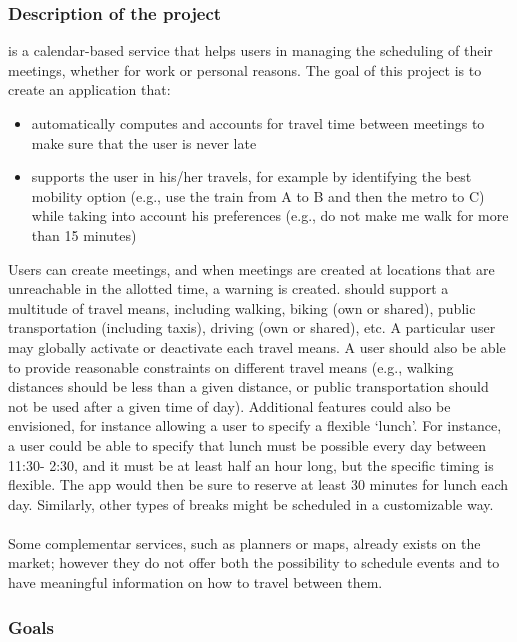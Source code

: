 \subsubsection{Description of the project}

\projectname is a calendar-based service that helps users in managing the scheduling of their meetings, whether for work or personal reasons.
The goal of this project is to create an application that: 
\begin{itemize}
\item automatically computes and accounts for travel time between meetings to make sure that the user is never late
\item supports the user in his/her travels, for example by identifying the best mobility option (e.g., use the train from A to B and then the metro to C) while taking into account his preferences (e.g., do not make me walk for more than 15 minutes)
\end{itemize}
Users can create meetings, and when meetings are created at locations that are unreachable in the allotted time, a warning is created. \projectname should support a multitude of travel means, including walking, biking (own or shared), public transportation (including taxis), driving (own or shared), etc. A particular user may globally activate or deactivate each travel means. A user should also be able to provide reasonable constraints on different travel means (e.g., walking distances should be less than a given distance, or public transportation should not be used after a given time of day). Additional features could also be envisioned, for instance allowing a user to specify a flexible `lunch'. For instance, a user could be able to specify that lunch must be possible every day between 11:30- 2:30, and it must be at least half an hour long, but the specific timing is flexible. The app would then be sure to reserve at least 30 minutes for lunch each day. Similarly, other types of breaks might be scheduled in a customizable way.
\\
\\
Some complementar services, such as planners or maps, already exists on the market; however they do not offer both the possibility to schedule events and to have meaningful information on how to travel between them.

\subsubsection{Goals}

